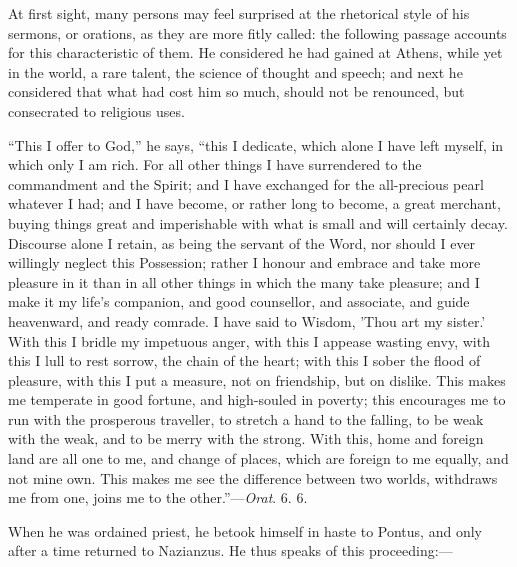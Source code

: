 At first sight, many persons may feel surprised at the rhetorical
style of his sermons, or orations, as they are more fitly called: the
following passage accounts for this characteristic of them. He
considered he had gained at Athens, while yet in the world, a rare
talent, the science of thought and speech; and next he considered that
what had cost him so much, should not be renounced, but consecrated to
religious uses.

``This I offer to God,'' he says, ``this I dedicate,
which alone I have left myself, in which only I am rich. For all other
things I have surrendered to the commandment and the Spirit; and I
have exchanged for the all-precious pearl whatever I had; and I have
become, or rather long to become, a great merchant, buying things
great and imperishable with what is small and will certainly decay.
Discourse alone I retain, as being the servant of the Word, nor should
I ever willingly neglect this Possession; rather I honour and embrace
and take more pleasure in it than in all other things in which the
many take pleasure; and I make it my life's companion, and good
counsellor, and associate, and guide heavenward, and ready comrade. I
have said to Wisdom, 'Thou art my sister.' With this I bridle my
impetuous anger, with this I appease wasting envy, with this I lull to
rest sorrow, the chain of the heart; with this I sober the flood of
pleasure, with this I put a measure, not on friendship, but on
dislike. This makes me temperate in good fortune, and high-souled in
poverty; this encourages me to run with the prosperous traveller, to
stretch a hand to the falling, to be weak with the weak, and to be
merry with the strong. With this, home and
foreign land are all one to me, and change of places, which are
foreign to me equally, and not mine own. This makes me see the
difference between two worlds, withdraws me from one, joins me to the
other.''—\emph{Orat}. 6. 6.

When he was ordained priest, he betook himself in haste to Pontus,
and only after a time returned to Nazianzus. He thus speaks of this
proceeding:—

